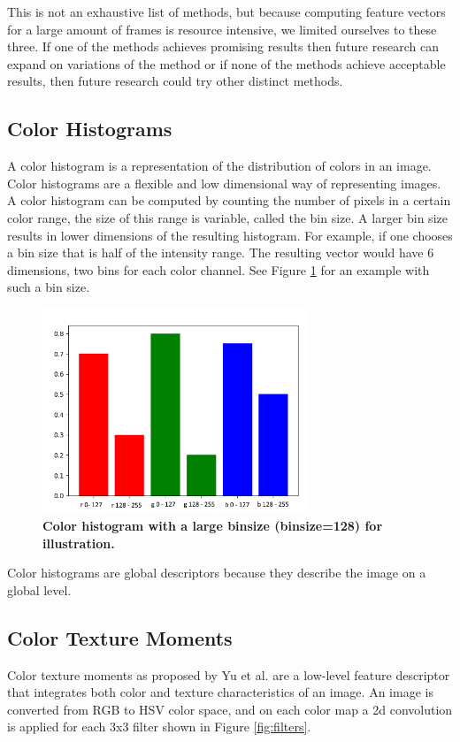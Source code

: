 \documentclass{article}
\begin{document}
This is not an exhaustive list of methods, but because computing feature vectors for a large amount of frames is resource intensive, we limited ourselves to these three. If one of the methods achieves promising results then future research can expand on variations of the method or if none of the methods achieve acceptable results, then future research could try other distinct methods.

\subsection{Color Histograms}
A color histogram is a representation of the distribution of colors in an image. Color histograms are a flexible and low dimensional way of representing images. A color histogram can be computed by counting the number of pixels in a certain color range, the size of this range is variable, called the bin size. A larger bin size results in lower dimensions of the resulting histogram. For example, if one chooses a bin size that is half of the intensity range. The resulting vector would have 6 dimensions, two bins for each color channel. See Figure \ref{fig:colorhistogram} for an example with such a bin size.
\begin{figure}[H]
	\includegraphics[width=8cm]{images/colorhistogram.png}
	\centering
	\caption{\textbf{Color histogram with a large binsize (binsize=128) for illustration.}}
	\label{fig:colorhistogram}
\end{figure}
Color histograms are global descriptors because they describe the image on a global level.

\subsection{Color Texture Moments}
Color texture moments as proposed by Yu et al. \cite{yu2002colortexturemoments} are a low-level feature descriptor that integrates both color and texture characteristics of an image. An image is converted from RGB to HSV color space, and on each color map a 2d convolution is applied for each 3x3 filter shown in Figure \ref{fig:filters}.
\end{document}
